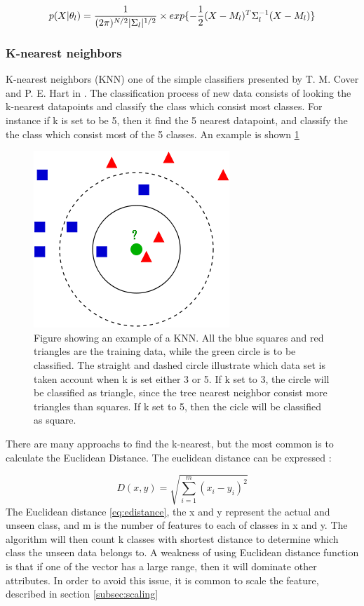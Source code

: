 \documentclass[USenglish]{ifimaster}  %
\begin{document}
\begin{equation}
p(X\vert \theta_{l}) = {1\over (2\pi)^{N/2}\vert \Sigma_{l}\vert ^{1/2}} \times{exp}\{-{1\over 2}(X-M_{l})^{T}\Sigma_{l}^{-1}(X-M_{l})\} 
    \label{eq:bayesLast}
\end{equation}


\subsubsection{K-nearest neighbors }
K-nearest neighbors (KNN) one of the simple classifiers presented by  T. M. Cover and P. E. Hart in \cite{1053964}. The classification process of new data consists of looking the k-nearest datapoints and classify the class which consist most classes. For instance if k is set to be 5, then it find the 5 nearest datapoint, and classify the the class which consist most of the 5 classes.  An example is shown \ref{fig:KNN}

\begin{figure}[h]
    \centering
    \includegraphics[scale=0.5]{Figures/KNN.png}
    \caption{Figure showing an example of a KNN\cite{KnnClassification}. All the blue squares and red triangles are the training data, while the green circle is to be classified. The straight and dashed circle illustrate which data set is taken account when k is set either 3 or 5. If k set to  3, the circle will be classified as triangle, since the tree nearest neighbor consist more triangles than squares. If k set to 5, then the cicle will be classified as square.}
    \label{fig:KNN}
\end{figure}

There are many approachs to find the k-nearest, but the most common is to calculate the Euclidean Distance. The euclidean distance can be expressed \cite{Bao2004}:


\begin{equation}
    D(x,y)=\sqrt{\sum_{i=1}^{m}(x_{i}-y_{i})^2}
    \label{eq:edistance}
\end{equation}
The Euclidean distance \ref{eq:edistance}, the x and y represent the actual and unseen class, and m is the number of features to each of classes in x and y. The algorithm will then count k classes with shortest distance to determine which class the unseen data belongs to. A weakness of using Euclidean distance function is that if one of the vector has a large range, then it will dominate other attributes. In order to avoid this issue, it is common to scale the feature, described in section \ref{subsec:scaling}
\end{document}
